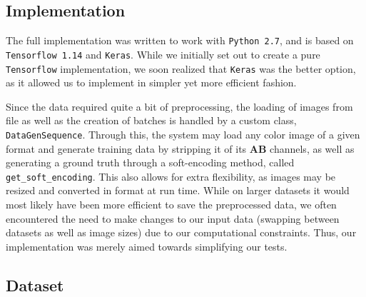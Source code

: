 \documentclass[twoside,twocolumn]{article}
\begin{document}
\subsection{Implementation}

The full implementation was written to work with \texttt{Python 2.7}, and is based on \texttt{Tensorflow 1.14} and \texttt{Keras}. While we initially set out to create a pure \texttt{Tensorflow} implementation, we soon realized that \texttt{Keras} was the better option, as it allowed us to implement in simpler yet more efficient fashion.

Since the data required quite a bit of preprocessing, the loading of images from file as well as the creation of batches is handled by a custom class, \texttt{DataGenSequence}. Through this, the system may load any color image of a given format and generate training data by stripping it of its \textbf{AB} channels, as well as generating a ground truth through a soft-encoding method, called \texttt{get\_soft\_encoding}. This also allows for extra flexibility, as images may be resized and converted in format at run time. While on larger datasets it would most likely have been more efficient to save the preprocessed data, we often encountered the need to make changes to our input data (swapping between datasets as well as image sizes) due to our computational constraints. Thus, our implementation was merely aimed towards simplifying our tests.


\subsection{Dataset}
\end{document}
